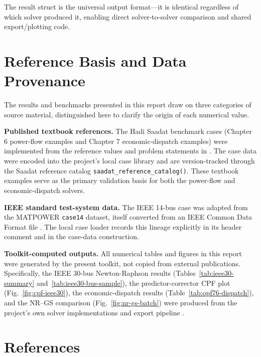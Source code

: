 \documentclass[12pt,a4paper]{article}
\begin{document}
The result struct is the universal output format---it is identical regardless of which solver produced it, enabling direct solver-to-solver comparison and shared export/plotting code.

\section{Reference Basis and Data Provenance}

The results and benchmarks presented in this report draw on three categories of source material, distinguished here to clarify the origin of each numerical value.

\textbf{Published textbook references.}
The Hadi Saadat benchmark cases (Chapter 6 power-flow examples and Chapter 7 economic-dispatch examples) were implemented from the reference values and problem statements in \cite{saadat1999}. The case data were encoded into the project's local case library and are version-tracked through the Saadat reference catalog \texttt{saadat\_reference\_catalog()}. These textbook examples serve as the primary validation basis for both the power-flow and economic-dispatch solvers.

\textbf{IEEE standard test-system data.}
The IEEE 14-bus case was adapted from the MATPOWER \texttt{case14} dataset, itself converted from an IEEE Common Data Format file \cite{matpowercase14,matpower2011}. The local case loader records this lineage explicitly in its header comment and in the case-data construction.

\textbf{Toolkit-computed outputs.}
All numerical tables and figures in this report were generated by the present toolkit, not copied from external publications. Specifically, the IEEE 30-bus Newton-Raphson results (Tables~\ref{tab:ieee30-summary} and~\ref{tab:ieee30-bus-sample}), the predictor-corrector CPF plot (Fig.~\ref{fig:cpf-ieee30}), the economic-dispatch results (Table~\ref{tab:opf76-dispatch}), and the NR--GS comparison (Fig.~\ref{fig:nr-gs-batch}) were produced from the project's own solver implementations and export pipeline \cite{localproject2026}.

\section{References}
\end{document}
